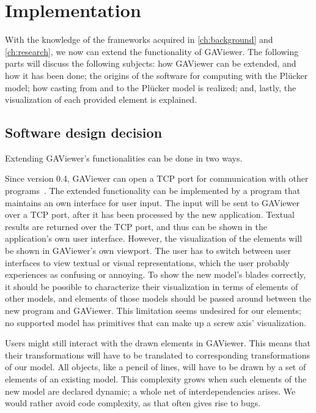 \section{Implementation}
\label{ch:implementation}
With the knowledge of the frameworks acquired in \autoref{ch:background} and \autoref{ch:research}, we now can extend the functionality of GAViewer.  The following parts will discuss the following subjects: how GAViewer can be extended, and how it has been done;  the origins of the software for computing with the Pl\"ucker model;  how casting from and to the Pl\"ucker model is realized;  and, lastly, the visualization of each provided element is explained.


\subsection{Software design decision}
\label{sec:softwaredesign}
Extending GAViewer's functionalities can be done in two ways.  

Since version 0.4, GAViewer can open a TCP port for communication with other programs~\cite{GAViewer}.  The extended functionality can be implemented by a program that maintains an own interface for user input.  The input will be sent to GAViewer over a TCP port, after it has been processed by the new application.  Textual results are returned over the TCP port, and thus can be shown in the application's own user interface.  However, the visualization of the elements will be shown in GAViewer's own viewport.  The user has to switch between user interfaces to view textual or visual representations, which the user probably experiences as confusing or annoying.  To show the new model's blades correctly, it should be possible to characterize their visualization in terms of elements of other models, and elements of those models should be passed around between the new program and GAViewer.  This limitation seems undesired for our elements; no supported model has primitives that can make up a screw axis' visualization.  

Users might still interact with the drawn elements in GAViewer.  This means that their transformations will have to be translated to corresponding transformations of our model.  All objects, like a pencil of lines, will have to be drawn by a set of elements of an existing model.  This complexity grows when such elements of the new model are declared dynamic; a whole net of interdependencies arises.  We would rather avoid code complexity, as that often gives rise to bugs.

